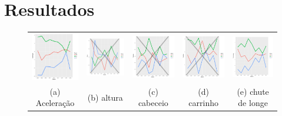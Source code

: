 \documentclass[doc,apacite,oneside,a4paper,12pt]{apa6}
\begin{document}
\section{Resultados}
\label{sec:reslt}

\newpage

\begin{figure}
\begin{tabular}{ccccc}
  \includegraphics[width=25mm]{aceleracao_result} & \includegraphics[width=25mm]{altura_result} & \includegraphics[width=25mm]{cabeceio_result} &   \includegraphics[width=25mm]{carrinho_result} &
  \includegraphics[width=25mm]{ch_delonge_result} \\
\scriptsize{(a) Aceleração } & \scriptsize{(b) altura  } & \scriptsize{(c) cabeceio } & \scriptsize{(d) carrinho } & \scriptsize{(e) chute de longe }\\[3pt]

\end{tabular}
\end{figure}
\end{document}
